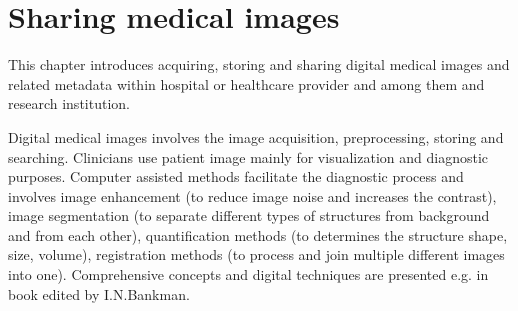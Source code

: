 \chapter{Sharing medical images}
\label{sec:imaging}
This chapter introduces acquiring, storing and sharing digital medical images and related metadata within hospital or healthcare provider and among them and research institution.







Digital medical images involves the image acquisition, preprocessing, storing and searching.
Clinicians use patient image mainly for visualization and diagnostic purposes. Computer assisted methods facilitate the diagnostic process and involves image enhancement (to reduce image noise and increases the contrast), image segmentation (to separate different types of structures from background and from each other), quantification methods (to determines the structure shape, size, volume), registration methods (to process and join multiple different images into one).
Comprehensive concepts and digital techniques are presented e.g. in book edited by I.N.Bankman\cite{Bankman2000}.

